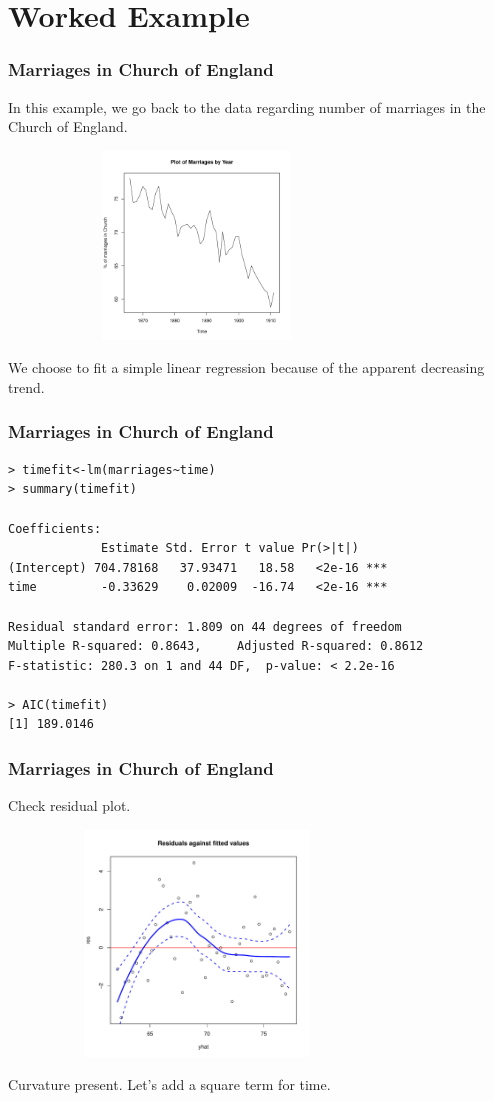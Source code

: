 \documentclass[%
xcolor=pdftex]{beamer}
\begin{document}
\section{Worked Example}
\frame{\tableofcontents[currentsection]}

\begin{frame}
\frametitle{Marriages in Church of England}

In this example, we go back to the data regarding number of marriages in the Church of England.

\includegraphics[width=100mm, height=50mm]{pics/marriagesplot.pdf}

We choose to fit a simple linear regression because of the apparent decreasing trend.

\end{frame}

\begin{frame}[fragile]
\frametitle{Marriages in Church of England}

\begin{verbatim}
> timefit<-lm(marriages~time)
> summary(timefit)

Coefficients:
             Estimate Std. Error t value Pr(>|t|)
(Intercept) 704.78168   37.93471   18.58   <2e-16 ***
time         -0.33629    0.02009  -16.74   <2e-16 ***

Residual standard error: 1.809 on 44 degrees of freedom
Multiple R-squared: 0.8643,     Adjusted R-squared: 0.8612
F-statistic: 280.3 on 1 and 44 DF,  p-value: < 2.2e-16

> AIC(timefit)
[1] 189.0146
\end{verbatim}

\end{frame}

\begin{frame}
\frametitle{Marriages in Church of England}

Check residual plot.

\includegraphics[width=100mm, height=60mm]{pics/residtimefit.pdf}

Curvature present. Let's add a square term for time.

\end{frame}
\end{document}
